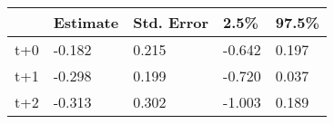 \begin{tabular}{lllll}
  \toprule
  & Estimate & Std. Error & 2.5\% & 97.5\% \\ 
  \midrule
t+0 & -0.182 & 0.215 & -0.642 & 0.197 \\ 
  t+1 & -0.298 & 0.199 & -0.720 & 0.037 \\ 
  t+2 & -0.313 & 0.302 & -1.003 & 0.189 \\ 
   \bottomrule
\end{tabular}
